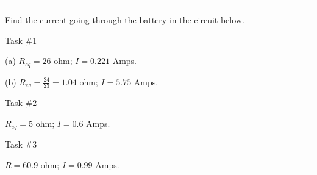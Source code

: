 \documentclass[12pt]{exam}
\begin{document}
\begin{questions}
\vs \hrule \vs


\question
  Find the current going through the battery in the circuit below.
    

  
\end{questions}

\pagebreak

Task \#1 

(a) $R_{eq}=26$ ohm; $I=0.221$ Amps.

(b) $R_{eq}=\frac{24}{23}=1.04$ ohm; $I=5.75$ Amps.

\vspace{2em}

Task \#2

$R_{eq}=5$ ohm;  $I=0.6$ Amps.

\vspace{2em}

Task \#3

$R=60.9$ ohm; $I=0.99$ Amps.
\end{document}
